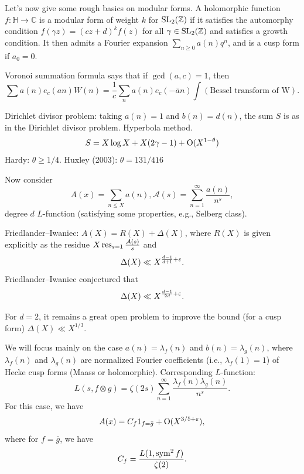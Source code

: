\documentclass[reqno]{amsart} 
\begin{document}
Let's now give some rough basics on modular forms.  A holomorphic function $f : \mathbb{H} \rightarrow \mathbb{C}$ is a modular form of weight $k$ for $\operatorname{SL}_2(\mathbb{Z})$ if it satisfies the automorphy condition $f(\gamma z) =(c z + d)^k f(z)$ for all $\gamma \in \operatorname{SL}_2(\mathbb{Z})$ and satisfies a growth condition.  It then admits a Fourier expansion $\sum_{n \geq 0} a(n) q^n$, and is a cusp form if $a_0 = 0$.

Voronoi summation formula says that if $\gcd(a, c) = 1$, then
\begin{equation*}
  \sum a(n) e_c(a n) W(n)
  = \frac{1}{c}
  \sum_n a(n) e_c(- \bar{a} n)
  \int(\text{Bessel transform of W}).
\end{equation*}

Dirichlet divisor problem: taking $a(n) = 1$ and $b(n) = d(n)$, the sum $S$ is as in the Dirichlet divisor problem.  Hyperbola method.
\begin{equation*}
  S = X \log X +  X(2 \gamma - 1) + \operatorname{O}(X^{1 - \theta})
\end{equation*}
Hardy: $\theta \geq 1/4$.
Huxley (2003): $\theta = 131/416$

Now consider
\begin{equation*}
  A(x) = \sum_{n \leq X} a(n), \mathcal{A}(s) = \sum_{n = 1}^\infty \frac{a(n)}{ n^s},
\end{equation*}
degree $d$ $L$-function (satisfying some properties, e.g., Selberg class).

Friedlander--Iwaniec: $A(X) = R(X) + \Delta(X)$, where $R(X)$ is given explicitly as the residue $X \operatorname{res}_{s=1} \frac{\mathcal{A}(s)}{s}$ and
\begin{equation*}
  \Delta(X) \ll X^{\frac{d - 1}{ d + 1} + \varepsilon}.
\end{equation*}
Friedlander--Iwaniec conjectured that
\begin{equation*}
  \Delta(X) \ll X^{\frac{d - 1}{2 d} + \varepsilon}.
\end{equation*}

For $d = 2$, it remains a great open problem to improve the bound (for a cusp form) $\Delta(X) \ll X^{1/3}$.

We will focus mainly on the case $a(n) = \lambda_f(n)$ and $b(n) = \lambda_g(n)$, where $\lambda_f(n)$ and $\lambda_g(n)$ are normalized Fourier coefficients (i.e., $\lambda_f(1) = 1$) of Hecke cusp forms (Maass or holomorphic).  Corresponding $L$-function:
\begin{equation*}
  L(s, f \otimes g) = \zeta(2 s) \sum_{n = 1}^\infty \frac{\lambda_f(n) \lambda_g(n)}{ n^s}.
\end{equation*}
For this case, we have
\begin{equation*}
  A(x) = C_f 1_{f = \bar{g}} + \operatorname{O}(X^{3/5 + \varepsilon}),
\end{equation*}
where for $f = \bar{g}$, we have
\begin{equation*}
  C_f = \frac{L(1, \operatorname{sym}^2 f)}{ \zeta(2)}.
\end{equation*}
\end{document}
